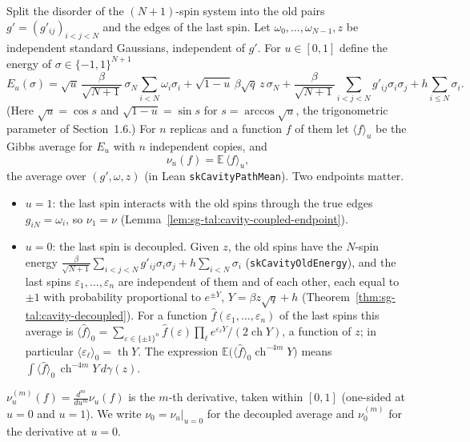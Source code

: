 \begin{definition}\label{def:sg-tal:hanen-cavity-path}
\leanok
{}
Split the disorder of the $(N+1)$-spin system into the old pairs $g'=(g'_{ij})_{i<j<N}$ and the edges of the last spin.
Let $\omega_0,\dots,\omega_{N-1},z$ be independent standard Gaussians, independent of $g'$.
For $u\in[0,1]$ define the energy of $\sigma\in\{-1,1\}^{N+1}$
\[
E_u(\sigma)=\sqrt u\,\frac{\beta}{\sqrt{N+1}}\,\sigma_N\sum_{i<N}\omega_i\sigma_i
+\sqrt{1-u}\,\beta\sqrt q\,z\,\sigma_N
+\frac{\beta}{\sqrt{N+1}}\sum_{i<j<N}g'_{ij}\sigma_i\sigma_j+h\sum_{i\le N}\sigma_i .
\]
(Here $\sqrt u=\cos s$ and $\sqrt{1-u}=\sin s$ for $s=\arccos\sqrt u$, the trigonometric parameter of Section~1.6.)
For $n$ replicas and a function $f$ of them let $\langle f\rangle_u$ be the Gibbs average for $E_u$ with $n$ independent copies,
and
\[
\nu_u(f)=\mathbb E\,\langle f\rangle_u ,
\]
the average over $(g',\omega,z)$ (in Lean \texttt{skCavityPathMean}).
Two endpoints matter.
\begin{itemize}
\item $u=1$: the last spin interacts with the old spins through the true edges $g_{iN}=\omega_i$, so $\nu_1=\nu$ (Lemma~\ref{lem:sg-tal:cavity-coupled-endpoint}).
\item $u=0$: the last spin is decoupled. Given $z$, the old spins have the $N$-spin energy
$\frac{\beta}{\sqrt{N+1}}\sum_{i<j<N}g'_{ij}\sigma_i\sigma_j+h\sum_{i<N}\sigma_i$ (\texttt{skCavityOldEnergy}), and the last spins $\varepsilon_1,\dots,\varepsilon_n$ are independent of them and of each other, each equal to $\pm1$ with
probability proportional to $e^{\pm Y}$, $Y=\beta z\sqrt q+h$ (Theorem~\ref{thm:sg-tal:cavity-decoupled}).
For a function $\hat f(\varepsilon_1,\dots,\varepsilon_n)$ of the last spins this average is
$\langle\hat f\rangle_0=\sum_{\varepsilon\in\{\pm1\}^n}\hat f(\varepsilon)\prod_\ell e^{\varepsilon_\ell Y}/(2\operatorname{ch}Y)$,
a function of $z$; in particular $\langle\varepsilon_\ell\rangle_0=\operatorname{th}Y$. The expression
$\mathbb E\bigl(\langle\hat f\rangle_0\operatorname{ch}^{-4m}Y\bigr)$ means
$\int\langle\hat f\rangle_0\,\operatorname{ch}^{-4m}Y\,d\gamma(z)$.
\end{itemize}
$\nu_u^{(m)}(f)=\frac{d^m}{du^m}\nu_u(f)$ is the $m$-th derivative, taken within $[0,1]$ (one-sided at $u=0$ and $u=1$).
We write $\nu_0=\nu_u|_{u=0}$ for the decoupled average and $\nu_0^{(m)}$ for the derivative at $u=0$.
\end{definition}

